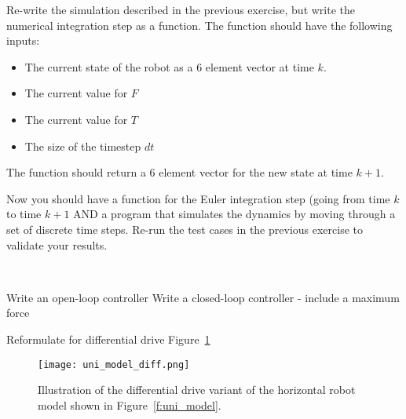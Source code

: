 \begin{ex}
Re-write the simulation described in the previous exercise, but write the numerical integration step as a function.  The function should have the following inputs:
\begin{itemize}
\item The current state of the robot as a 6 element vector at time $k$.
\item The current value for $F$
\item The current value for $T$
\item The size of the timestep $dt$
\end{itemize}
The function should return a 6 element vector for the new state at time $k+1$.

Now you should have a function for the Euler integration step (going from time $k$ to time $k+1$ AND a program that simulates the dynamics by moving through a set of discrete time steps.  Re-run the test cases in the previous exercise to validate your results.
\end{ex}




\
\begin{ex}
Write an open-loop  controller
Write a closed-loop controller - include a maximum force
\end{ex}

\begin{ex}
Reformulate for differential drive
Figure~\ref{f:uni_model_diff}
\end{ex}

\begin{figure}[hbt]
\centering
\texttt{[image: uni\_model\_diff.png]}
\caption{Illustration of the differential drive variant of the horizontal robot model shown in Figure~\ref{f:uni_model}.}
\label{f:uni_model_diff}
\end{figure}
